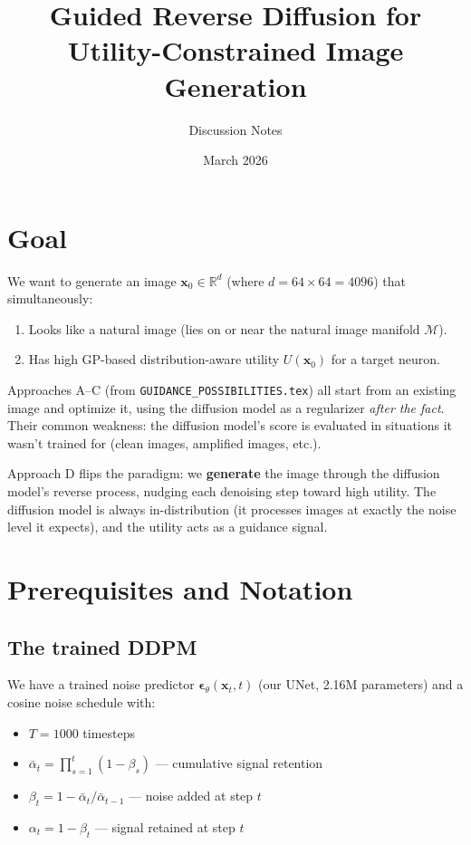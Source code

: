 \documentclass[11pt]{article}
\title{Guided Reverse Diffusion for\\Utility-Constrained Image Generation}
\author{Discussion Notes}
\date{March 2026}
\newcommand{\xb}{\mathbf{x}}
\newcommand{\eb}{\boldsymbol{\epsilon}}
\newcommand{\R}{\mathbb{R}}
\newcommand{\alphabar}{\bar{\alpha}}
\begin{document}
\maketitle

\tableofcontents
\vspace{1em}

\section{Goal}

We want to generate an image $\xb_0 \in \R^d$ (where $d = 64 \times 64 = 4096$)
that simultaneously:
\begin{enumerate}[nosep]
    \item Looks like a natural image (lies on or near the natural image manifold $\mathcal{M}$).
    \item Has high GP-based distribution-aware utility $U(\xb_0)$ for a target neuron.
\end{enumerate}

Approaches A--C (from \texttt{GUIDANCE\_POSSIBILITIES.tex}) all start from an existing image
and optimize it, using the diffusion model as a regularizer \emph{after the fact}.
Their common weakness: the diffusion model's score is evaluated in situations it wasn't
trained for (clean images, amplified images, etc.).

Approach D flips the paradigm: we \textbf{generate} the image through the diffusion model's
reverse process, nudging each denoising step toward high utility. The diffusion model
is always in-distribution (it processes images at exactly the noise level it expects),
and the utility acts as a guidance signal.

\section{Prerequisites and Notation}

\subsection{The trained DDPM}

We have a trained noise predictor $\eb_\theta(\xb_t, t)$ (our UNet, 2.16M parameters)
and a cosine noise schedule with:
\begin{itemize}[nosep]
    \item $T = 1000$ timesteps
    \item $\alphabar_t = \prod_{s=1}^t (1 - \beta_s)$ --- cumulative signal retention
    \item $\beta_t = 1 - \alphabar_t / \alphabar_{t-1}$ --- noise added at step $t$
    \item $\alpha_t = 1 - \beta_t$ --- signal retained at step $t$
\end{itemize}
\end{document}
